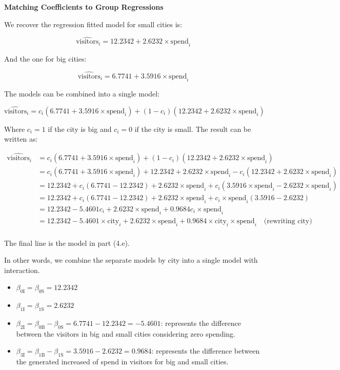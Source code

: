 \documentclass{article}
\begin{document}
\textbf{Matching Coefficients to Group Regressions}

We recover the regression fitted model for small cities is:

$$
\hat{\text{visitors}}_i = 12.2342 + 2.6232 \times \text{spend}_i
$$

And the one for big cities:

$$
\hat{\text{visitors}}_i = 6.7741 + 3.5916 \times \text{spend}_i
$$

The models can be combined into a single model:

$$
\hat{\text{visitors}}_i = c_i (6.7741 + 3.5916 \times \text{spend}_i) + (1 - c_i) (12.2342 + 2.6232 \times \text{spend}_i)
$$

Where $c_i = 1$ if the city is big and $c_i = 0$ if the city is small. The result can be written as:

\begin{align*}
  \hat{\text{visitors}}_i 
  &= c_i (6.7741 + 3.5916 \times \text{spend}_i) + (1 - c_i) (12.2342 + 2.6232 \times \text{spend}_i) \\
  &= c_i (6.7741 + 3.5916 \times \text{spend}_i) + 12.2342 + 2.6232 \times \text{spend}_i - c_i (12.2342 + 2.6232 \times \text{spend}_i) \\
  &=  12.2342 + c_i (6.7741 - 12.2342) + 2.6232 \times \text{spend}_i + c_i (3.5916 \times \text{spend}_i - 2.6232 \times \text{spend}_i) \\
  &=  12.2342 + c_i (6.7741 - 12.2342) + 2.6232 \times \text{spend}_i + c_i \times \text{spend}_i (3.5916 - 2.6232) \\
  &=  12.2342 - 5.4601 c_i + 2.6232 \times \text{spend}_i + 0.9684 c_i \times \text{spend}_i \\
  &=  12.2342 - 5.4601 \times \text{city}_i + 2.6232 \times \text{spend}_i + 0.9684  \times \text{city}_i \times \text{spend}_i \quad \text{(rewriting city)} \\
\end{align*}

The final line is the model in part (4.e).

In other words, we combine the separate models by city into a single model with interaction.

\begin{itemize}
  \item $\beta_{0 \text{I}} = \beta_{0 \text{S}} = 12.2342$
  \item $\beta_{1 \text{I}} = \beta_{1 \text{S}} = 2.6232$
  \item $\beta_{2 \text{I}} = \beta_{0 \text{B}} - \beta_{0 \text{S}} = 6.7741 - 12.2342 = - 5.4601$: represents the difference between the visitors in big and small cities considering zero spending.
  \item $\beta_{3 \text{I}} = \beta_{1 \text{B}} - \beta_{1 \text{S}} = 3.5916 - 2.6232 = 0.9684$: represents the difference between the generated increased of spend in visitors for big and small cities.
\end{itemize}
\end{document}
